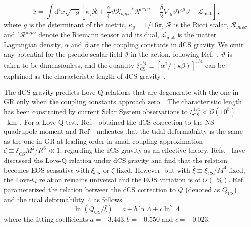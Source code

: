 \documentclass[a4paper,11pt]{article}
\newcommand{\ZW}[1]{\textcolor{magenta}{$\mathcal{ZW}$:~#1}}
\begin{document}
\begin{equation}
   \label{cs_action}
   S = \int \mathrm{d}^4 x \sqrt{-g}\left[ \kappa_g \mathcal{R} + \frac{\alpha}{4} \mathcal{\vartheta} \mathcal{R}_{\nu\mu\rho\sigma} {}^{*}\mathcal{R}^{\mu\nu\rho\sigma} - \frac{\beta}{2}\nabla_{\mu}\mathcal{\vartheta}\nabla^{\mu}\mathcal{\vartheta} + \mathcal{L}_{\mathrm{mat}}\right]\,,
\end{equation}
where $g$ is the determinant of the metric, $\kappa_g= 1/16\pi$, $\mathcal{R}$ is 
the Ricci scalar, $\mathcal{R}_{\nu\mu\rho\sigma}$ and
$^{*}\mathcal{R}^{\mu\nu\rho\sigma}$ denote the Riemann tensor and its dual, 
$\mathcal{L}_{\mathrm{mat}}$ is the matter Lagrangian density, 
$\alpha$ and $\beta$ are the coupling constants in dCS gravity. We omit any 
potential for the pseudo-scalar field $\mathcal{\vartheta}$ in the action, 
following Ref.~\cite{Gupta:2017vsl}. $\mathcal{\vartheta}$ is taken to be 
dimensionless, and the quantity $\xi_{\mathrm{CS}}^{1/4} \equiv [\alpha^2/
(\kappa\beta)]^{1/4}$ can be explained as 
the characteristic length of dCS gravity~\cite{Yunes:2009hc,Yagi:2012ya}. 

The dCS gravity predicts Love-Q relations that are degenerate with the one in GR 
only when the coupling constants approach zero~\cite{Yagi:2013bca,
Yagi:2013awa,Gupta:2017vsl}. The characteristic length has been constrained by 
current Solar System observations to $\xi_{\mathrm{CS}}^{1/4}<\mathcal{O}(10^8)$~km~\cite{Ali-Haimoud:2011zme,Yagi:2012ya}. 
For a Love-Q test, Ref.~\cite{Yagi:2013mbt} obtained the dCS correction to the NS 
quadrupole moment and Ref.~\cite{Yagi:2011xp} indicates that the tidal 
deformability is the same as the one in GR at leading order in small coupling 
approximation $\zeta \equiv \xi_{\mathrm{CS}} M^2/R^6 \ll 1$, regarding the dCS 
gravity as an effective theory. Refs.~\cite{Yagi_2017,Yagi:2013mbt,Gupta:2017vsl} 
have discussed the Love-Q relation under dCS gravity and find that the relation 
becomes EOS-sensative with $\xi_{\mathrm{CS}}$ or $\zeta$ fixed. However, but with 
$\bar{\xi}\equiv \xi_{\mathrm{CS}}/M^4$ fixed, the Love-Q relation remains 
universal and the EOS variation is of $\mathcal{O}(1\%)$. Ref.~\cite{Gupta:2017vsl} 
parameterized the relation between the dCS correction to $Q$ (denoted as $Q_{\mathrm{CS}}$) and the tidal deformability $\Lambda$ as follows
\begin{equation}
    \label{cs_Love_Q_eq}
    \ln (Q_{\mathrm{CS}}/\bar{\xi}) = a + b \ln \Lambda + c \ln^{2} \Lambda
\end{equation} 
where the fitting coefficients $a=-3.443, b=-0.550$ and $c=-0.023$. 
\end{document}
